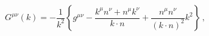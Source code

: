 \begin{equation}
G^{\mu \nu }(k)=-\frac{1}{k^{2}}\left\{ g^{\mu \nu }-\frac{k^{\mu }n^{\nu
}+n^{\mu }k^{\nu }}{k\cdot n}+\frac{n^{\mu }n^{\nu }}{(k\cdot n)^{2}}%
k^{2}\right\} \,,  \label{17}
\end{equation}

